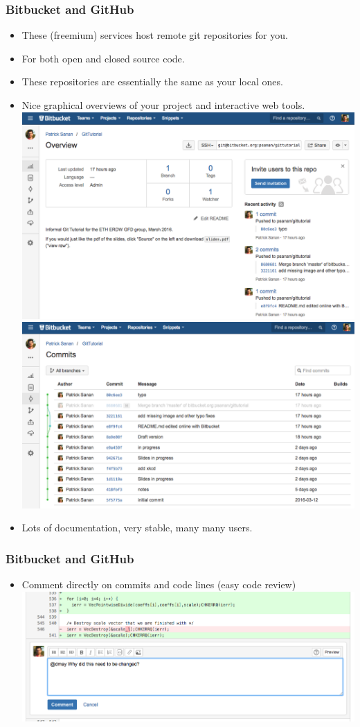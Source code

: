 \documentclass{beamer}
\begin{document}
\begin{frame}[fragile]
\frametitle{Bitbucket and GitHub}
\begin{itemize}
\item These (freemium) services host remote git repositories for you. 
\item For both open and closed source code.
\item These repositories are essentially the same as your local ones.
\item Nice graphical overviews of your project and interactive web tools.
\includegraphics[scale=0.15]{bitbucket2}
\includegraphics[scale=0.15]{bitbucket3}
\item Lots of documentation, very stable, many many users.
\end{itemize}
\end{frame}

\begin{frame}[fragile]
\frametitle{Bitbucket and GitHub}
\begin{itemize}
\item Comment directly on commits and code lines (easy code review)
\includegraphics[scale=0.3]{bitbucket1}
\end{itemize}
\end{frame}
\end{document}
